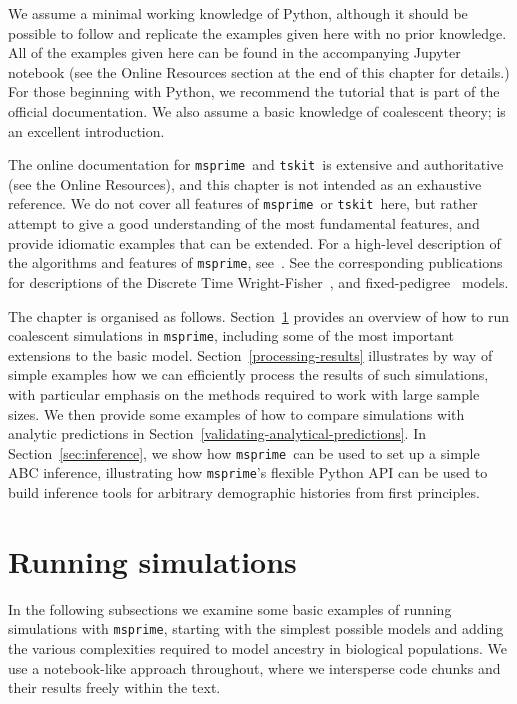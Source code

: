 \documentclass[graybox]{svmult}
\newcommand{\msprime}[0]{\texttt{msprime}}
\newcommand{\tskit}[0]{\texttt{tskit}}
\begin{document}
We assume a minimal working knowledge of Python, although it should be
possible to follow and replicate the examples given here with no prior
knowledge. All of the examples
given here can be found in the accompanying Jupyter notebook (see
the Online Resources section at the end of this chapter for details.)
For those beginning with Python, we recommend the
tutorial that is part of the official documentation.
We also assume a basic knowledge of coalescent theory;
\cite{wakely2008coalescent} is an excellent introduction.

The online documentation for \msprime\ and \tskit\ is extensive and
authoritative (see the Online Resources), and this chapter is not intended as an exhaustive reference.
We do not cover all features of \msprime\ or \tskit\ here, but rather
attempt to give a good understanding of the most fundamental features,
and provide idiomatic examples that can be extended. For a high-level
description of the algorithms and features of \msprime,
see~\cite{kelleher2016efficient,baumdicker2022efficient}.
See the corresponding publications for descriptions of
the Discrete Time Wright-Fisher~\cite{nelson2020accounting},
and fixed-pedigree~\cite{andersontrocme2023genes} models.

The chapter is organised as follows.
Section~\ref{running-simulations} provides an overview of how to run coalescent simulations in \msprime, including some of the most important extensions to the basic model.
Section~\ref{processing-results} illustrates by way of simple examples how we can efficiently process the results
of such simulations, with particular emphasis on the methods
required to work with large sample sizes. We then provide
some examples of how to compare simulations with analytic
predictions in Section~\ref{validating-analytical-predictions}.
In Section~\ref{sec:inference}, we show
how \msprime\ can be used to set up a simple ABC inference,
illustrating how
\msprime's flexible Python API can be used to build inference tools for
arbitrary demographic histories from first principles.

\section{Running simulations}
\label{running-simulations}
In the following subsections we examine some basic examples of running
simulations with \msprime, starting with the simplest possible models
and adding the various complexities required to model ancestry in biological populations.
We use a notebook-like approach throughout, where we
intersperse code chunks and their results freely within the text.
\end{document}
